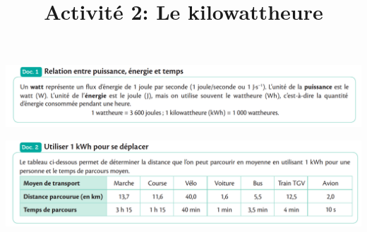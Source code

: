 \documentclass[10pt]{article}
\newcommand{\titreActivite}{Activité 2: Le kilowattheure} %
\begin{document}
\date{}
\title{\titreActivite}
\maketitle %

\vspace{10pt}
\includegraphics[scale=0.32]{assets/doc1.png}

\includegraphics[scale=0.32]{assets/doc2.png}
\end{document}
